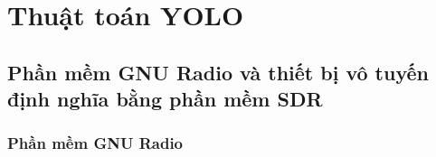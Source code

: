 \clearpage
{}

\setcounter{chapter}{1}
\chapter[{CƠ SỞ LÝ THUYẾT}]{Thuật toán YOLO}

\section{Phần mềm GNU Radio và thiết bị vô tuyến định nghĩa bằng phần mềm SDR}

\subsection{Phần mềm GNU Radio}

\renewcommand{\labelitemi}{$-$}
